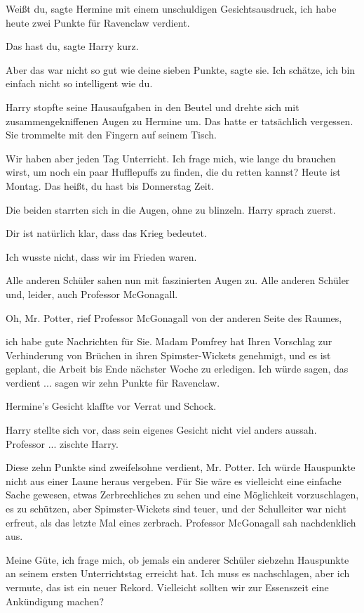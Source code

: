 \glqq Weißt du\grqq{}, sagte Hermine mit einem unschuldigen Gesichtsausdruck,
\glqq ich habe heute zwei Punkte für Ravenclaw verdient.\grqq{}

\glqq Das hast du\grqq{}, sagte Harry kurz.

\glqq Aber das war nicht so gut wie deine sieben Punkte\grqq{}, sagte sie.
\glqq Ich schätze, ich bin einfach nicht so intelligent wie du.\grqq{}

Harry stopfte seine Hausaufgaben in den Beutel und drehte sich mit
zusammengekniffenen Augen zu Hermine um. Das hatte er tatsächlich vergessen. Sie
trommelte mit den Fingern auf seinem Tisch.

\glqq Wir haben aber jeden Tag Unterricht. Ich frage mich, wie lange du brauchen
wirst, um noch ein paar Hufflepuffs zu finden, die du retten kannst? Heute ist
Montag. Das heißt, du hast bis Donnerstag Zeit.\grqq{}

Die beiden starrten sich in die Augen, ohne zu blinzeln. Harry sprach zuerst.

\glqq Dir ist natürlich klar, dass das Krieg bedeutet.\grqq{}

\glqq Ich wusste nicht, dass wir im Frieden waren.\grqq{}

Alle anderen Schüler sahen nun mit faszinierten Augen zu. Alle anderen Schüler
und, leider, auch Professor McGonagall.

\glqq Oh, Mr. Potter\grqq{}, rief Professor McGonagall von der anderen Seite
des Raumes,

\glqq ich habe gute Nachrichten für Sie. Madam Pomfrey hat Ihren Vorschlag zur
Verhinderung von Brüchen in ihren Spimster-Wickets genehmigt, und es ist
geplant, die Arbeit bis Ende nächster Woche zu erledigen. Ich würde sagen, das
verdient ... sagen wir zehn Punkte für Ravenclaw.\grqq{}

Hermine's Gesicht klaffte vor Verrat und Schock.

Harry stellte sich vor, dass sein eigenes Gesicht nicht viel anders aussah.
\glqq Professor ...\grqq{} zischte Harry.

\glqq Diese zehn Punkte sind zweifelsohne verdient, Mr. Potter. Ich würde
Hauspunkte nicht aus einer Laune heraus vergeben. Für Sie wäre es vielleicht
eine einfache Sache gewesen, etwas Zerbrechliches zu sehen und eine Möglichkeit
vorzuschlagen, es zu schützen, aber Spimster-Wickets sind teuer, und der
Schulleiter war nicht erfreut, als das letzte Mal eines zerbrach. Professor
McGonagall sah nachdenklich aus.

\glqq Meine Güte, ich frage mich, ob jemals ein anderer Schüler siebzehn
Hauspunkte an seinem ersten Unterrichtstag erreicht hat. Ich muss es
nachschlagen, aber ich vermute, das ist ein neuer Rekord. Vielleicht sollten wir
zur Essenszeit eine Ankündigung machen?\grqq{}


